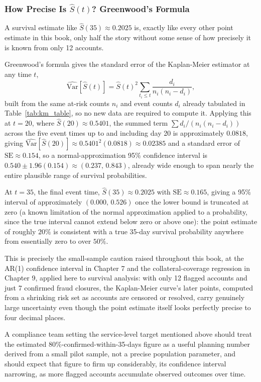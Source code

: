 \documentclass[../ai_in_finance]{subfiles}
\begin{document}
\subsubsection*{How Precise Is $\hat S(t)$? Greenwood's Formula}

A survival estimate like $\hat S(35)\approx0.2025$ is, exactly like every other point estimate in this book, only half the story without some sense of how precisely it is known from only 12 accounts.

Greenwood's formula gives the standard error of the Kaplan-Meier estimator at any time $t$,
\begin{equation*}
\widehat{\text{Var}}[\hat S(t)] = \hat S(t)^2 \sum_{t_i \le t} \frac{d_i}{n_i(n_i-d_i)},
\end{equation*}
built from the same at-risk counts $n_i$ and event counts $d_i$ already tabulated in Table~\ref{tab:km_table}, so no new data are required to compute it. Applying this at $t=20$, where $\hat S(20)\approx0.5401$, the summed term $\sum d_i/(n_i(n_i-d_i))$ across the five event times up to and including day 20 is approximately $0.0818$, giving $\widehat{\text{Var}}[\hat S(20)] \approx 0.5401^2(0.0818) \approx 0.02385$ and a standard error of $\text{SE}\approx0.154$, so a normal-approximation 95\% confidence interval is $0.540\pm1.96(0.154)\approx(0.237,\,0.843)$, already wide enough to span nearly the entire plausible range of survival probabilities.

At $t=35$, the final event time, $\hat S(35)\approx0.2025$ with $\text{SE}\approx0.165$, giving a 95\% interval of approximately $(0.000,\,0.526)$ once the lower bound is truncated at zero (a known limitation of the normal approximation applied to a probability, since the true interval cannot extend below zero or above one): the point estimate of roughly $20\%$ is consistent with a true 35-day survival probability anywhere from essentially zero to over $50\%$.

This is precisely the small-sample caution raised throughout this book, at the AR(1) confidence interval in Chapter 7 and the collateral-coverage regression in Chapter 9, applied here to survival analysis: with only 12 flagged accounts and just 7 confirmed fraud closures, the Kaplan-Meier curve's later points, computed from a shrinking risk set as accounts are censored or resolved, carry genuinely large uncertainty even though the point estimate itself looks perfectly precise to four decimal places.

A compliance team setting the service-level target mentioned above should treat the estimated $80\%$-confirmed-within-35-days figure as a useful planning number derived from a small pilot sample, not a precise population parameter, and should expect that figure to firm up considerably, its confidence interval narrowing, as more flagged accounts accumulate observed outcomes over time.
\end{document}
